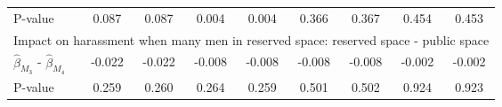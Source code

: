 \begin{tabular}{l*{8}{c}}
\quad P-value       &       0.087         &       0.087         &       0.004         &       0.004         &       0.366         &       0.367         &       0.454         &       0.453         \\
\multicolumn{9}{l}{Impact on harassment when many men in reserved space: reserved space - public space} \\\quad $\hat\beta_{M_3}$ - $\hat\beta_{M_4}$&      -0.022         &      -0.022         &      -0.008         &      -0.008         &      -0.008         &      -0.008         &      -0.002         &      -0.002         \\
\quad P-value       &       0.259         &       0.260         &       0.264         &       0.259         &       0.501         &       0.502         &       0.924         &       0.923         \\
\hline\hline \end{tabular}
